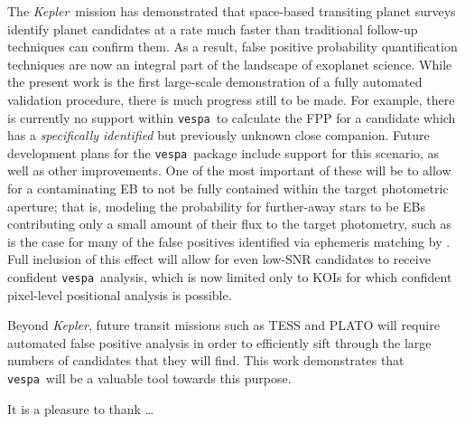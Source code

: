 \documentclass{emulateapj}
\newcommand{\kepler}{\textit{Kepler}}
\newcommand{\vespa}{\texttt{vespa}}
\begin{document}
The \kepler\ mission has demonstrated that space-based transiting
planet surveys identify planet candidates at a rate much faster than
traditional follow-up techniques can confirm them.  As a result, false
positive probability quantification techniques are now an integral
part of the landscape of exoplanet science.  While the present work is
the first large-scale demonstration of a fully automated validation
procedure, there is much progress still to be made.  For example,
there is currently no support within \vespa\ to calculate the FPP for
a candidate which has a \emph{specifically identified} but previously
unknown close companion.  Future development plans for the
\vespa\ package include support for this scenario, as well as other
improvements.  One of the most important of these will be to allow for
a contaminating EB to not be fully contained within the target
photometric aperture; that is, modeling the probability for
further-away stars to be EBs contributing only a small amount of their
flux to the target photometry, such as is the case for many of the
false positives identified via ephemeris matching by
\citet{Coughlin:2014}.  Full inclusion of this effect will allow for
even low-SNR candidates to receive confident \vespa\ analysis, which
is now limited only to KOIs for which confident pixel-level positional
analysis is possible.

Beyond \kepler, future transit missions such as TESS and PLATO will
require automated false positive analysis in order to efficiently sift
through the large numbers of candidates that they will find.  This
work demonstrates that \vespa\ will be a valuable tool towards this
purpose.



\acknowledgments
It is a pleasure to thank
\ldots\

\clearpage

\clearpage
\end{document}
